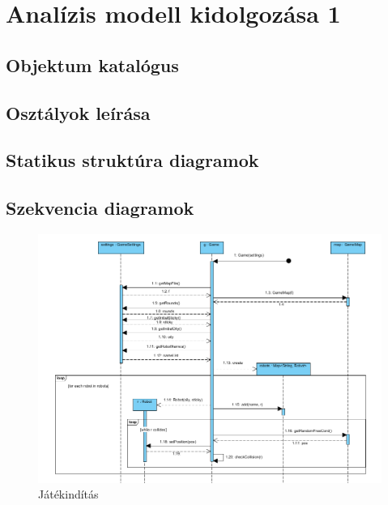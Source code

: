 %
\chapter{Analízis modell kidolgozása 1}

\thispagestyle{fancy}

\section{Objektum katalógus}





\section{Osztályok leírása}



\section{Statikus struktúra diagramok}


\clearpage

\section{Szekvencia diagramok}

\begin{figure}[!htbp]
\begin{center}
	\includegraphics[width=\textwidth, center]{./chapters/chapter03/startgame.png}
	\caption{Játékindítás}
\end{center}
\end{figure}

